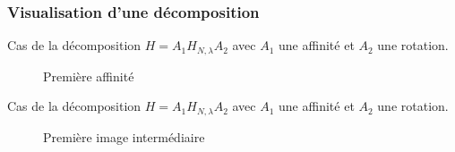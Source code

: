 \documentclass[c,12pt]{beamer}
\newcommand{\Arrow}{{ \raisebox{10\height}{\scalebox{1}{$\longrightarrow$}}}}
\begin{document}
\subsubsection{Visualisation d'une décomposition}
  \begin{frame}
  Cas de la décomposition $H=A_1H_{N,\lambda}A_2$ avec $A_1$ une affinité et $A_2$ une rotation.
  \begin{figure}
   \Arrow
   \caption{Première affinité}
  \end{figure}
  \end{frame}
  
  \begin{frame}
  Cas de la décomposition $H=A_1H_{N,\lambda}A_2$ avec $A_1$ une affinité et $A_2$ une rotation.
  \begin{figure}
   \caption{Première image intermédiaire}
  \end{figure}
  \end{frame}
  
\end{document}
